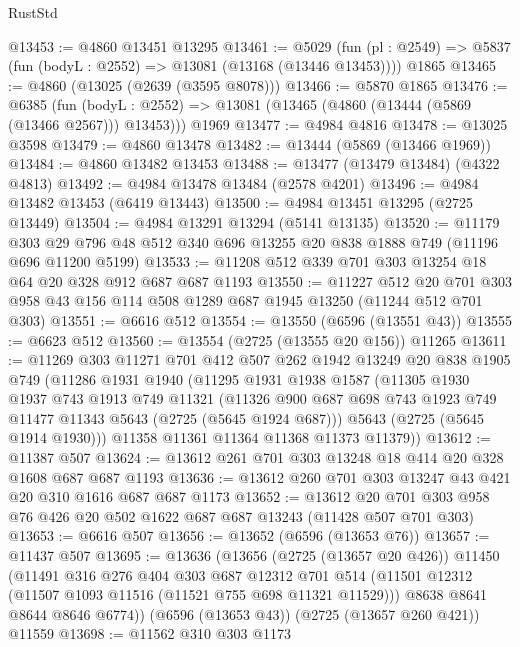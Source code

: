 \begin{lexlean}{RustStd}
\begin{coremodule}
@13453 := @4860 @13451 @13295
@13461 := @5029
    (fun (pl : @2549) => @5837 (fun (bodyL : @2552) => @13081 (@13168 (@13446 @13453))))
    @1865
@13465 := @4860 (@13025 (@2639 (@3595 @8078)))
@13466 := @5870 @1865
@13476 := @6385
    (fun (bodyL : @2552) => @13081 (@13465 (@4860 (@13444 (@5869 (@13466 @2567))) @13453)))
    @1969
@13477 := @4984 @4816
@13478 := @13025 @3598
@13479 := @4860 @13478
@13482 := @13444 (@5869 (@13466 @1969))
@13484 := @4860 @13482 @13453
@13488 := @13477 (@13479 @13484) (@4322 @4813)
@13492 := @4984 @13478 @13484 (@2578 @4201)
@13496 := @4984 @13482 @13453 (@6419 @13443)
@13500 := @4984 @13451 @13295 (@2725 @13449)
@13504 := @4984 @13291 @13294 (@5141 @13135)
@13520 := @11179
    @303
    @29
    @796
    @48
    @512
    @340
    @696
    @13255
    @20
    @838
    @1888
    @749
    (@11196 @696 @11200 @5199)
@13533 := @11208 @512 @339 @701 @303 @13254 @18 @64 @20 @328 @912 @687 @687 @1193
@13550 := @11227
    @512
    @20
    @701
    @303
    @958
    @43
    @156
    @114
    @508
    @1289
    @687
    @1945
    @13250
    (@11244 @512 @701 @303)
@13551 := @6616 @512
@13554 := @13550 (@6596 (@13551 @43))
@13555 := @6623 @512
@13560 := @13554 (@2725 (@13555 @20 @156)) @11265
@13611 := @11269
    @303
    @11271
    @701
    @412
    @507
    @262
    @1942
    @13249
    @20
    @838
    @1905
    @749
    (@11286
      @1931
      @1940
      (@11295
        @1931
        @1938
        @1587
        (@11305
          @1930
          @1937
          @743
          @1913
          @749
          @11321
          (@11326 @900 @687 @698 @743 @1923 @749 @11477 @11343 @5643 (@2725 (@5645 @1924 @687)))
          @5643
          (@2725 (@5645 @1914 @1930)))
        @11358
        @11361
        @11364
        @11368
        @11373
        @11379))
@13612 := @11387 @507
@13624 := @13612 @261 @701 @303 @13248 @18 @414 @20 @328 @1608 @687 @687 @1193
@13636 := @13612 @260 @701 @303 @13247 @43 @421 @20 @310 @1616 @687 @687 @1173
@13652 := @13612 @20 @701 @303 @958 @76 @426 @20 @502 @1622 @687 @687 @13243 (@11428 @507 @701 @303)
@13653 := @6616 @507
@13656 := @13652 (@6596 (@13653 @76))
@13657 := @11437 @507
@13695 := @13636
    (@13656
      (@2725 (@13657 @20 @426))
      @11450
      (@11491
        @316
        @276
        @404
        @303
        @687
        @12312
        @701
        @514
        (@11501 @12312 (@11507 @1093 @11516 (@11521 @755 @698 @11321 @11529)))
        @8638
        @8641
        @8644
        @8646
        @6774))
    (@6596 (@13653 @43))
    (@2725 (@13657 @260 @421))
    @11559
@13698 := @11562 @310 @303 @1173

\end{coremodule}
\end{lexlean}
